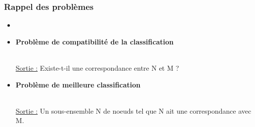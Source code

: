 \documentclass{beamer}
\begin{document}
\begin{frame}
\tableofcontents[currentsubsection]
\end{frame}

\begin{frame}
\frametitle{Rappel des problèmes}

\begin{itemize}
\item {}
\item \begin{flushcenter} \bf Problème de compatibilité de la classification\end{flushcenter}\\ \uline{Sortie :} Existe-t-il une correspondance entre N et M ?
\item \begin{flushcenter} \bf Problème de meilleure classification\end{flushcenter}\\ \uline{Sortie :} Un sous-ensemble N de noeuds tel que N ait une correspondance avec M.
\end{itemize}


\end{frame}
\end{document}
